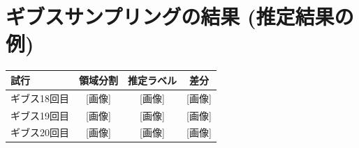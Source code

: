 \documentclass[pdftex,11pt,a4paper]{jlreq} %
\begin{document}
\section{ギブスサンプリングの結果 (推定結果の例)}

\begin{table}[h]
    \centering
    \begin{tabular}{lccc}
        \toprule
        試行 & 領域分割 & 推定ラベル & 差分 \\
        \midrule
        ギブス18回目 & [画像] & [画像] & [画像] \\
        ギブス19回目 & [画像] & [画像] & [画像] \\
        ギブス20回目 & [画像] & [画像] & [画像] \\
        \bottomrule
    \end{tabular}
\end{table}
\end{document}
